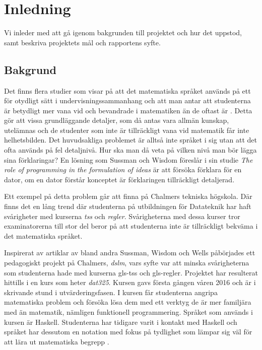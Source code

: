 \documentclass[12pt,a4paper,twoside,openright]{article}
\begin{document}
\newpage

\setcounter{page}{1}
\setlength{\parskip}{2mm plus2mm}

\section{Inledning}
Vi inleder med att gå igenom bakgrunden till projektet och hur det
uppstod, samt beskriva projektets mål och rapportens syfte.

\subsection{Bakgrund}
%

Det finns flera studier som visar på att det matematiska språket
används på ett för otydligt sätt i undervisningssammanhang och att man
antar att studenterna är betydligt mer vana vid och bevandrade i
matematiken än de oftast är \cite{sussman2002role}
\cite{wells1995communicating}. Detta gör att vissa grundläggande
detaljer, som då antas vara allmän kunskap, utelämnas och de studenter
som inte är tillräckligt vana vid matematik får inte helhetsbilden.
Det huvudsakliga problemet är alltså inte språket i sig utan att det
ofta används på fel detaljnivå. Hur ska man då veta på vilken nivå man
bör lägga sina förklaringar? En lösning som Sussman och Wisdom
föreslår i sin studie \textit{The role of programming in the
  formulation of ideas} \cite{sussman2002role} är att försöka förklara
för en dator, om en dator förstår konceptet är förklaringen
tillräckligt detaljerad.

Ett exempel på detta problem går att finna på Chalmers tekniska
högskola. Där finns det en lång trend där studenterna på utbildningen
för Datateknik har haft svårigheter med kurserna \textit{\gls{tss}} och
\textit{\gls{regler}}. Svårigheterna med dessa kurser tror
examinatorerna till stor del beror på att studenterna inte är
tillräckligt bekväma i det matematiska språket.

Inspirerat av artiklar av bland andra Sussman, Wisdom och Wells
påbörjades ett pedagogiskt projekt på Chalmers, \textit{\gls{dslm}},
vars syfte var att minska svårigheterna som studenterna hade med
kurserna \gls{gls-tss} och \gls{gls-regler}. Projektet har resulterat hittills
i en kurs som heter \textit{\gls{dat325}}. Kursen
gavs första gången våren 2016 och är i skrivande stund i
utvärderingsfasen. I kursen får studenterna angripa matematiska
problem och försöka lösa dem med ett verktyg de är mer familjära med
än matematik, nämligen funktionell programmering. Språket som används
i kursen är Haskell. Studenterna har tidigare varit i kontakt med
Haskell och språket har dessutom en notation med fokus på tydlighet
som lämpar sig väl för att lära ut matematiska begrepp
\cite{TFPIE15_DSLsofMath_IonescuJansson}.
\end{document}

